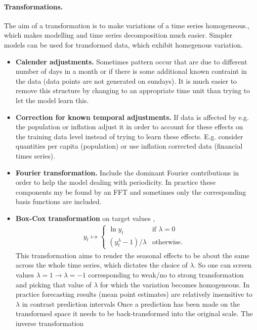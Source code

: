 \documentclass[12pt,a4paper]{article}
\begin{document}
\paragraph{Transformations.}
The aim of a transformation is to make variations of a time series homogeneous., which makes modelling and time series decomposition much easier. Simpler models can be used for transformed data, which exhibit  homegenous variation. 
\begin{itemize}
	\item \textbf{Calender adjustments.} Sometimes pattern occur that are due to different number of days in a month or if there is some additional known contraint in the data  (data points are not generated on sundays). It is much easier to remove this structure by changing to an appropriate time unit than trying to let the model learn this.
	\item \textbf{Correction for known temporal adjustments.} If data is affected by e.g. the population or inflation adjust it in order to account for these effects on the training data level instead of trying to learn these effects. E.g. consider quantities per capita (population) or use inflation corrected data (financial times series).
	\item \textbf{Fourier transformation.} Include the dominant Fourier contributions in order to help the model dealing with periodicity. In practice these components my be found by an FFT and sometimes only the corresponding basis functions are included.
	\item \textbf{Box-Cox transformation} on target values \cite{hyndman_forecasting_principles_2018}, 
	\begin{align}
	y_t \mapsto 
	\begin{cases}
	 \ln y_t & \text{if } \lambda = 0\\ 
	 (y_t^\lambda - 1) /  \lambda & \text{otherwise.}
	\end{cases}	
	\end{align}
	This transformation aims to render the seasonal effects to be about the same across the whole time series, which dictates the choice of $\lambda$. So one can screen values $\lambda = 1 \rightarrow  \lambda = -1 $ corresponding to weak/no to strong transformation and picking that value of $\lambda$ for which the variation becomes homogeneous. In practice forecasting results (mean point estimates) are relatively insensitive to $\lambda$ in contrast prediction intervals Once a prediction has been made on the transformed space it needs to be back-transformed into the original scale. The inverse transformation

\end{itemize}
\end{document}
